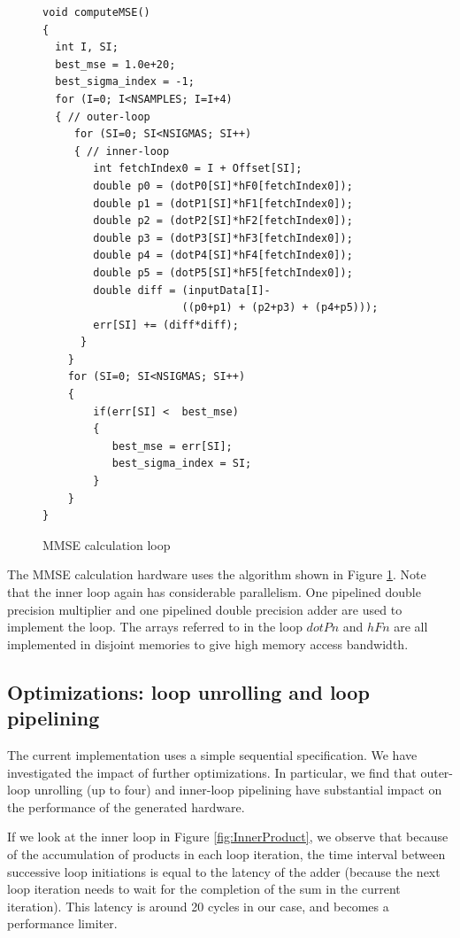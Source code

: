 \documentclass[conference]{IEEEtran}
\begin{document}
\begin{figure}
\begin{centering}
\footnotesize\begin{verbatim}
void computeMSE()
{
  int I, SI;
  best_mse = 1.0e+20;
  best_sigma_index = -1;
  for (I=0; I<NSAMPLES; I=I+4)
  { // outer-loop
     for (SI=0; SI<NSIGMAS; SI++)
     { // inner-loop
        int fetchIndex0 = I + Offset[SI]; 
        double p0 = (dotP0[SI]*hF0[fetchIndex0]);
        double p1 = (dotP1[SI]*hF1[fetchIndex0]);
        double p2 = (dotP2[SI]*hF2[fetchIndex0]);
        double p3 = (dotP3[SI]*hF3[fetchIndex0]);
        double p4 = (dotP4[SI]*hF4[fetchIndex0]);
        double p5 = (dotP5[SI]*hF5[fetchIndex0]);
        double diff = (inputData[I]-
                      ((p0+p1) + (p2+p3) + (p4+p5)));
        err[SI] += (diff*diff);
      }
    }
    for (SI=0; SI<NSIGMAS; SI++)
    {
        if(err[SI] <  best_mse)
        {
           best_mse = err[SI];
           best_sigma_index = SI;
        }
    }
}
\end{verbatim}
\normalsize
\end{centering}
\caption{MMSE calculation loop}
\label{fig:MMSE}
\end{figure}


The MMSE calculation hardware
uses the algorithm shown in Figure \ref{fig:MMSE}.
Note that the inner loop again has considerable parallelism.
One pipelined double precision multiplier and one
pipelined double precision adder are used to implement
the loop.  The arrays referred to in the loop
$dotPn$ and $hFn$ are all implemented in disjoint
memories to give high memory access bandwidth.



\subsection{Optimizations: loop unrolling and loop pipelining}

The current implementation uses a simple sequential specification.
We have investigated the impact of
further optimizations.  In particular, we find that outer-loop
unrolling (up to four) and inner-loop pipelining 
have substantial impact on the performance of the generated hardware.

If we look at the inner loop in Figure \ref{fig:InnerProduct},
we observe that because of the accumulation of products in each
loop iteration, the time interval between successive loop initiations
is equal to the latency of the adder (because the next loop iteration
needs to wait for the completion of the sum in the current iteration).  This
latency is around 20 cycles in our case, and becomes a performance limiter.
\end{document}

